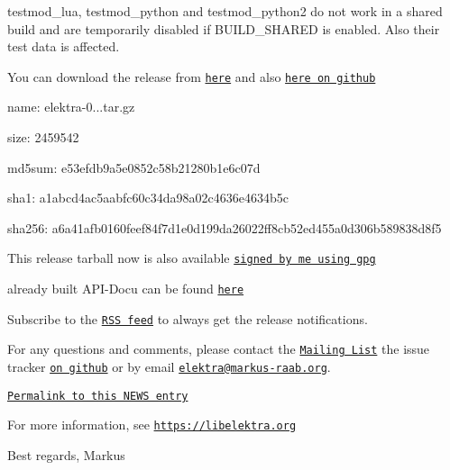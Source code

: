 \begin{DoxyItemize}
\item {\ttfamily testmod\+\_\+lua}, {\ttfamily testmod\+\_\+python} and {\ttfamily testmod\+\_\+python2} do not work in a shared build and are temporarily disabled if {\ttfamily B\+U\+I\+L\+D\+\_\+\+S\+H\+A\+R\+ED} is enabled. Also their test data is affected.
\end{DoxyItemize}

You can download the release from \href{https://www.libelektra.org/ftp/elektra/releases/elektra-0.8.17.tar.gz}{\tt here} and also \href{https://github.com/ElektraInitiative/ftp/tree/master/releases/elektra-0.8.17.tar.gz}{\tt here on github}


\begin{DoxyItemize}
\item name\+: elektra-\/0...\+tar.\+gz
\item size\+: 2459542
\item md5sum\+: e53efdb9a5e0852c58b21280b1e6c07d
\item sha1\+: a1abcd4ac5aabfc60c34da98a02c4636e4634b5c
\item sha256\+: a6a41afb0160feef84f7d1e0d199da26022ff8cb52ed455a0d306b589838d8f5
\end{DoxyItemize}

This release tarball now is also available \href{https://www.libelektra.org/ftp/elektra/releases/elektra-0.8.17.tar.gz.gpg}{\tt signed by me using gpg}

already built A\+P\+I-\/\+Docu can be found \href{https://doc.libelektra.org/api/0.8.17/html/}{\tt here}

Subscribe to the \href{https://doc.libelektra.org/news/feed.rss}{\tt R\+SS feed} to always get the release notifications.

For any questions and comments, please contact the \href{https://lists.sourceforge.net/lists/listinfo/registry-list}{\tt Mailing List} the issue tracker \href{https://git.libelektra.org/issues}{\tt on github} or by email \href{mailto:elektra@markus-raab.org}{\tt elektra@markus-\/raab.\+org}.

\href{https://doc.libelektra.org/news/e6153a39-c4bd-41c3-bc86-785d451eb6c5.html}{\tt Permalink to this N\+E\+WS entry}

For more information, see \href{https://libelektra.org}{\tt https\+://libelektra.\+org}

Best regards, Markus 